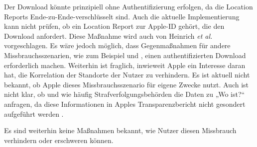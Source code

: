 Der Download könnte prinzipiell ohne Authentifizierung erfolgen, da die Location Reports Ende-zu-Ende-verschlüsselt sind.
Auch die aktuelle Implementierung kann nicht prüfen, ob ein Location Report zur Apple-ID gehört, die den Download anfordert.
Diese Maßnahme wird auch von Heinrich \textit{et al.} \cite{Heinrich_FindMy} vorgeschlagen.
Es wäre jedoch möglich, dass Gegenmaßnahmen für andere Missbrauchsszenarien, wie zum Beispiel  und , einen authentifizierten Download erforderlich machen.
Weiterhin ist fraglich, inwieweit Apple ein Interesse daran hat, die Korrelation der Standorte der Nutzer zu verhindern.
Es ist aktuell nicht bekannt, ob Apple dieses Missbrauchsszenario für eigene Zwecke nutzt.
Auch ist nicht klar, ob und wie häufig Strafverfolgungsbehörden die Daten zu „Wo ist?“ anfragen, da diese Informationen in Apples Transparenzbericht nicht gesondert aufgeführt werden \cite{Apple_Transparency}.

Es sind weiterhin keine Maßnahmen bekannt, wie Nutzer diesen Missbrauch verhindern oder erschweren können.

